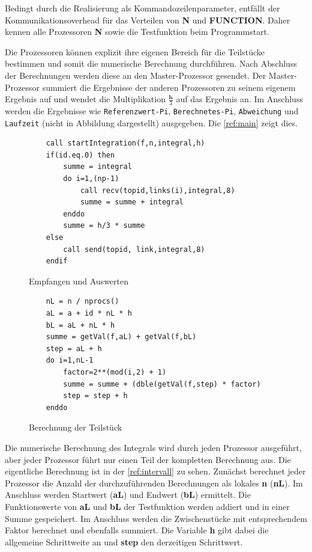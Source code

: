 Bedingt durch die Realisierung als Kommandozeilenparameter, entfällt der Kommunikationsoverhead für das Verteilen von \textbf{N} und \textbf{FUNCTION}.
Daher kennen alle Prozessoren \textbf{N} sowie die Testfunktion beim Programmstart.

Die Prozessoren können explizit ihre eigenen Bereich für die Teilstücke bestimmen und somit die numerische Berechnung durchführen.
Nach Abschluss der Berechnungen werden diese an den Master-Prozessor gesendet.
Der Master-Prozessor summiert die Ergebnisse der anderen Prozessoren zu seinem eigenem Ergebnis auf und wendet die Multiplikation $\frac{\textbf{h}}{3}$ auf das Ergebnis an.
Im Anschluss werden die Ergebnisse wie \texttt{Referenzwert-Pi}, \texttt{Berechnetes-Pi}, \texttt{Abweichung} und \texttt{Laufzeit} (nicht in Abbildung dargestellt) ausgegeben. 
Die \autoref{ref:main} zeigt dies.
\begin{figure}[h]
\hrulefill

\begin{minipage}{0.49\textwidth}
\begin{lstlisting}
	call startIntegration(f,n,integral,h)
	if(id.eq.0) then
		summe = integral
		do i=1,(np-1)
			call recv(topid,links(i),integral,8)
			summe = summe + integral
		enddo
		summe = h/3 * summe
	else
		call send(topid, link,integral,8)
	endif
\end{lstlisting}
	\caption{Empfangen und Auswerten}
	\label{ref:main}
\end{minipage}
\hfill
\vline
\begin{minipage}{0.49\textwidth}
\begin{lstlisting}
	nL = n / nprocs()
	aL = a + id * nL * h
	bL = aL + nL * h
	summe = getVal(f,aL) + getVal(f,bL)   
	step = aL + h
	do i=1,nL-1
		factor=2**(mod(i,2) + 1)
		summe = summe + (dble(getVal(f,step) * factor)
		step = step + h    
	enddo
\end{lstlisting}
	\caption{Berechnung der Teilstück}
	\label{ref:intervall}
\end{minipage}

\hrulefill
\end{figure}

Die numerische Berechnung des Integrals wird durch jeden Prozessor ausgeführt, aber jeder Prozessor führt nur einen Teil der kompletten Berechnung aus.
Die eigentliche Berechnung ist in der \autoref{ref:intervall} zu sehen.
Zunächst berechnet jeder Prozessor die Anzahl der durchzuführenden Berechnungen als lokales \textbf{n} (\textbf{nL}).
Im Anschluss werden Startwert (\textbf{aL}) und Endwert (\textbf{bL}) ermittelt.
Die Funktionswerte von \textbf{aL} und \textbf{bL} der Testfunktion werden addiert und in einer Summe gespeichert.
Im Anschluss werden die Zwischenstücke mit entsprechendem Faktor berechnet und ebenfalls summiert.
Die Variable \textbf{h} gibt dabei die allgemeine Schrittweite an und \textbf{step} den derzeitigen Schrittwert.

